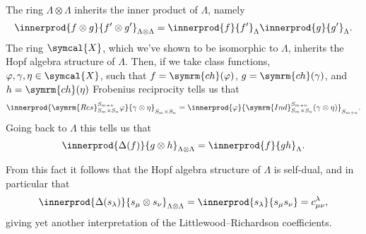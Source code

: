 \documentclass[fleqn]{NotesClass}
\newcommand{\classFunctions}{\symcal{X}}
\newcommand{\Res}{\symrm{Res}}
\newcommand{\Ind}{\symrm{Ind}}
\newcommand{\ch}{\symrm{ch}}
\begin{document}
    The ring \(\Lambda \otimes \Lambda\) inherits the inner product of \(\Lambda\), namely
    \begin{equation}
        \innerprod{f \otimes g}{f' \otimes g'}_{\Lambda \otimes \Lambda} = \innerprod{f}{f'}_{\Lambda} \innerprod{g}{g'}_{\Lambda}.
    \end{equation}
    The ring \(\classFunctions\), which we've shown to be isomorphic to \(\Lambda\), inherits the Hopf algebra structure of \(\Lambda\).
    Then, if we take class functions, \(\varphi, \gamma, \eta \in \classFunctions\), such that \(f = \ch(\varphi)\), \(g = \ch(\gamma)\), and \(h = \ch(\eta)\) Frobenius reciprocity tells us that
    \begin{equation}
        \innerprod{\Res^{S_{m+n}}_{S_m \times S_n} \varphi}{\gamma \otimes \eta}_{S_m \times S_n} = \innerprod{\varphi}{\Ind^{S_{m+n}}_{S_m \times S_n} (\gamma \otimes \eta)}_{S_{m + n}}.
    \end{equation}
    Going back to \(\Lambda\) this tells us that
    \begin{equation}
        \innerprod{\Delta(f)}{g \otimes h}_{\Lambda \otimes \Lambda} = \innerprod{f}{gh}_{\Lambda}.
    \end{equation}
    
    From this fact it follows that the Hopf algebra structure of \(\Lambda\) is self-dual, and in particular that
    \begin{equation}
        \innerprod{\Delta(s_\lambda)}{s_\mu \otimes s_\nu}_{\Lambda \otimes \Lambda} = \innerprod{s_\lambda}{s_\mu s_\nu} = c^\lambda_{\mu\nu},
    \end{equation}
    giving yet another interpretation of the Littlewood--Richardson coefficients.
    
\end{document}
